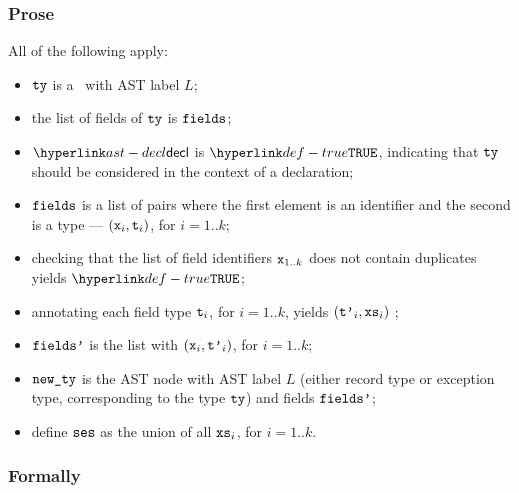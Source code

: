 \subsubsection{Prose}
All of the following apply:
\begin{itemize}
  \item $\tty$ is a \structuredtype\ with AST label $L$;
  \item the list of fields of $\tty$ is $\fields$;
  \item $\decl$ is $\True$, indicating that $\tty$ should be considered in the context of a declaration;
  \item $\fields$ is a list of pairs where the first element is an identifier and the second is a type --- $(\vx_i, \vt_i)$, for $i=1..k$;
  \item checking that the list of field identifiers $\vx_{1..k}$ does not contain duplicates
  yields $\True$\ProseOrTypeError;
  \item annotating each field type $\vt_i$, for $i=1..k$, yields $(\vtp_i, \vxs_i)$
        \ProseOrTypeError;
  \item $\fieldsp$ is the list with $(\vx_i, \vtp_i)$, for $i=1..k$;
  \item $\newty$ is the AST node with AST label $L$ (either record type or exception type,
  corresponding to the type $\tty$) and fields $\fieldsp$;
  \item define $\vses$ as the union of all $\vxs_i$, for $i=1..k$.
\end{itemize}

\subsubsection{Formally}
\begin{mathpar}
\end{mathpar}


